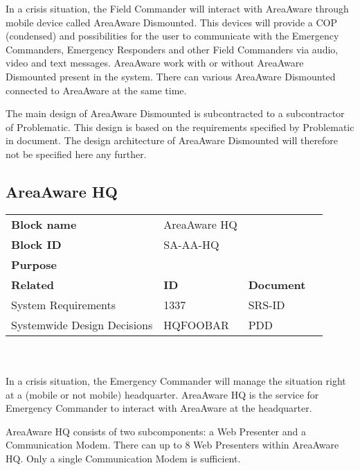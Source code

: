 \noindent In a crisis situation, the Field Commander will interact with AreaAware through mobile device called AreaAware Dismounted.
This devices will provide a COP (condensed) and possibilities for the user to communicate with the Emergency Commanders, Emergency Responders and other Field Commanders via audio, video and text messages.
AreaAware work with or without AreaAware Dismounted present in the system.
There can various AreaAware Dismounted connected to AreaAware at the same time.

The main design of AreaAware Dismounted is subcontracted to a subcontractor of Problematic.
This design is based on the requirements specified by Problematic in document.
The design architecture of AreaAware Dismounted will therefore not be specified here any further.

\subsection{AreaAware HQ}
\begin{tabular}{l|*{3}{l}}
    \textbf{Block name}     & AreaAware HQ \\
    \textbf{Block ID}       & SA-AA-HQ  & \\
    \textbf{Purpose}        &  \\
    \hline
    \textbf{Related}    & \textbf{ID} & \textbf{Document} \\
    System Requirements & 1337 & SRS-ID \\
    Systemwide Design Decisions & HQFOOBAR & PDD \\
\end{tabular}\\\\

\noindent In a crisis situation, the Emergency Commander will manage the situation right at a (mobile or not mobile) headquarter.
AreaAware HQ is the service for Emergency Commander to interact with AreaAware at the headquarter.




AreaAware HQ consists of two subcomponents: a Web Presenter and a Communication Modem.
There can up to 8 Web Presenters within AreaAware HQ.
Only a single Communication Modem is sufficient.


